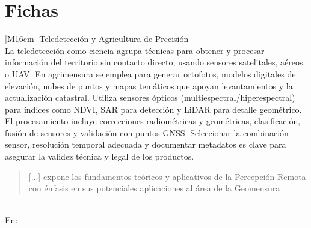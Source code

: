 \newpage

\section{Fichas}

\begin{table}[h!]
  \centering
  \renewcommand{\arraystretch}{2} %
  \begin{tabular}{|M{16cm}|}
    \hline
    Teledetección y Agricultura de Precisión \\
    \hline
    La teledetección como ciencia agrupa técnicas para obtener y procesar información del territorio sin contacto directo, usando sensores satelitales, aéreos o UAV. En agrimensura se emplea para generar ortofotos, modelos digitales de elevación, nubes de puntos y mapas temáticos que apoyan levantamientos y la actualización catastral. Utiliza sensores ópticos (multiespectral/hiperespectral) para índices como NDVI, SAR para detección y LiDAR para detalle geométrico. El procesamiento incluye correcciones radiométricas y geométricas, clasificación, fusión de sensores y validación con puntos GNSS. Seleccionar la combinación sensor, resolución temporal adecuada y documentar metadatos es clave para asegurar la validez técnica y legal de los productos. \begin{quote}
      [...] expone los fundamentos teóricos y aplicativos de la Percepción Remota con énfasis en sus potenciales aplicaciones al área de la Geomensura
    \end{quote} \\
    \hline
    En: \cite{En2009} \\
    \hline
  \end{tabular}
  \label{tab:Fichas}
\end{table}

